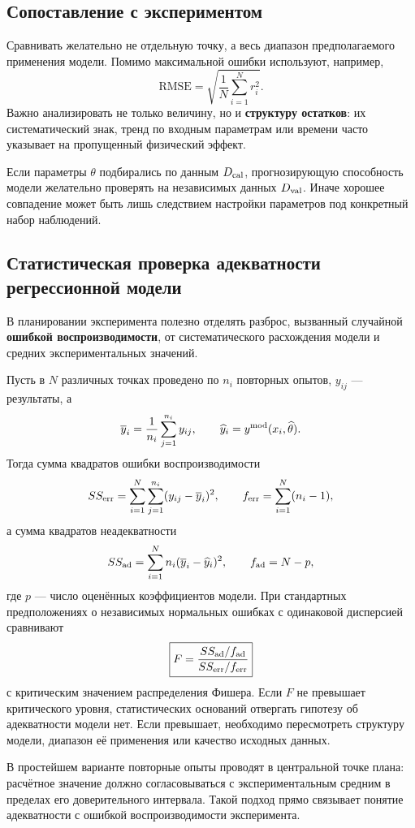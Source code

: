 \subsection{Сопоставление с экспериментом}

Сравнивать желательно не отдельную точку, а весь диапазон предполагаемого
применения модели. Помимо максимальной ошибки используют, например,
\[
    \mathrm{RMSE}
    =\sqrt{\frac1N\sum_{i=1}^{N}r_i^2}.
\]
Важно анализировать не только величину, но и \textbf{структуру остатков}: их
систематический знак, тренд по входным параметрам или времени часто указывает на
пропущенный физический эффект.

Если параметры $\theta$ подбирались по данным $D_{\rm cal}$, прогнозирующую
способность модели желательно проверять на независимых данных $D_{\rm val}$.
Иначе хорошее совпадение может быть лишь следствием настройки параметров под
конкретный набор наблюдений.

\subsection{Статистическая проверка адекватности регрессионной модели}

В планировании эксперимента полезно отделять разброс, вызванный случайной
\textbf{ошибкой воспроизводимости}, от систематического расхождения модели и
средних экспериментальных значений.

Пусть в $N$ различных точках проведено по $n_i$ повторных опытов,
$y_{ij}$ --- результаты, а
\[
    \overline y_i=\frac1{n_i}\sum_{j=1}^{n_i}y_{ij},
    \qquad
    \widehat y_i=y^{\rm mod}(x_i,\widehat\theta).
\]
Тогда сумма квадратов ошибки воспроизводимости
\[
    SS_{\rm err}
    =\sum_{i=1}^{N}\sum_{j=1}^{n_i}
      (y_{ij}-\overline y_i)^2,
    \qquad
    f_{\rm err}=\sum_{i=1}^{N}(n_i-1),
\]
а сумма квадратов неадекватности
\[
    SS_{\rm ad}
    =\sum_{i=1}^{N}n_i(\overline y_i-\widehat y_i)^2,
    \qquad
    f_{\rm ad}=N-p,
\]
где $p$ --- число оценённых коэффициентов модели. При стандартных предположениях
о независимых нормальных ошибках с одинаковой дисперсией сравнивают
\[
    \boxed{
    F=\frac{SS_{\rm ad}/f_{\rm ad}}
            {SS_{\rm err}/f_{\rm err}}
    }
\]
с критическим значением распределения Фишера. Если $F$ не превышает критического
уровня, статистических оснований отвергать гипотезу об адекватности модели нет.
Если превышает, необходимо пересмотреть структуру модели, диапазон её применения
или качество исходных данных.

В простейшем варианте повторные опыты проводят в центральной точке плана:
расчётное значение должно согласовываться с экспериментальным средним в пределах
его доверительного интервала. Такой подход прямо связывает понятие адекватности с
ошибкой воспроизводимости эксперимента.

